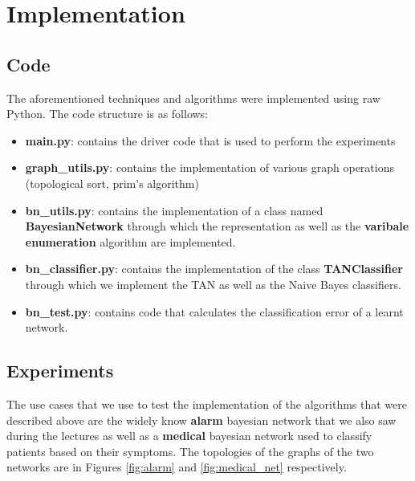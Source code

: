 \documentclass[11pt]{article}
\begin{document}
	\section{Implementation \label{sec:experiments}}
	\subsection{Code}
	The aforementioned techniques and algorithms were implemented using raw Python. The code structure is as follows:
	\begin{itemize}
		\item \textbf{main.py}: contains the driver code that is used to perform the experiments
		\item \textbf{graph\_utils.py}: contains the implementation of various graph operations (topological sort, prim's algorithm) 
		\item \textbf{bn\_utils.py}: contains the implementation of a class named \textbf{BayesianNetwork} through which the representation as well as the \textbf{varibale enumeration} algorithm are implemented.
		\item \textbf{bn\_classifier.py}: contains the implementation of the class \textbf{TANClassifier} through which we implement the TAN as well as the Naive Bayes classifiers.
		\item \textbf{bn\_test.py}: contains code that calculates the classification error of a learnt network.
	\end{itemize}
	\subsection{Experiments}
	The use cases that we use to test the implementation of the algorithms that were described above are the widely know \textbf{alarm} bayesian network that we also saw during the lectures as well as a \textbf{medical} bayesian network used to classify patients based on their symptoms. The topologies of the graphs of the two networks are in Figures \ref{fig:alarm} and \ref{fig:medical_net} respectively.
	
\end{document}
